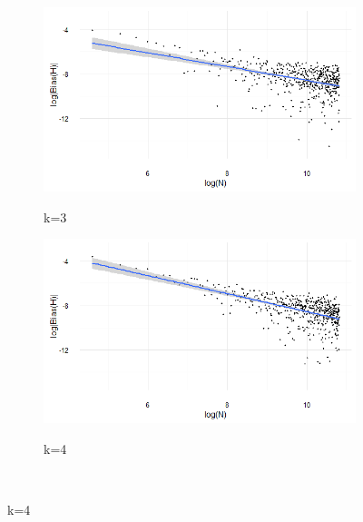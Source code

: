 \documentclass[12pt]{report}
\begin{document}
\begin{figure}
{\begin{subfigure}[b]{.6\textwidth}
\centering
\includegraphics[width=\textwidth]{./Graphs/Best/Normal_k=3.png}\label{normal_k=3}
\caption{k=3}
\end{subfigure}%
\begin{subfigure}[b]{.6\textwidth}
\centering
\includegraphics[width=\textwidth]{./Graphs/Best/Normal_k=4.png}\label{normal_k=4}
\caption{k=4}
\end{subfigure}%
}\    
\end{figure}
\end{document}
